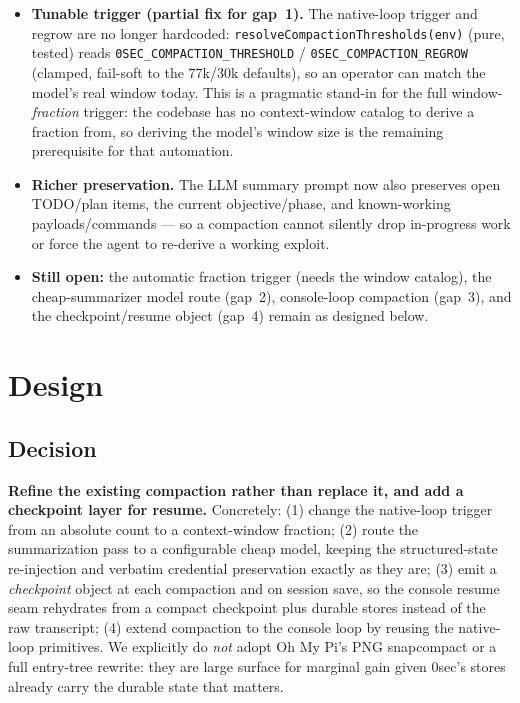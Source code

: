 \documentclass[11pt]{article}
\begin{document}
\begin{itemize}[leftmargin=1.6em]
\item \textbf{Tunable trigger (partial fix for gap~1).} The native-loop trigger
and regrow are no longer hardcoded: \texttt{resolveCompactionThresholds(env)}
(pure, tested) reads \texttt{0SEC\_COMPACTION\_THRESHOLD} /
\texttt{0SEC\_COMPACTION\_REGROW} (clamped, fail-soft to the $77$k/$30$k
defaults), so an operator can match the model's real window today. This is a
pragmatic stand-in for the full window-\emph{fraction} trigger: the codebase has
no context-window catalog to derive a fraction from, so deriving the model's
window size is the remaining prerequisite for that automation.
\item \textbf{Richer preservation.} The LLM summary prompt now also preserves
open TODO/plan items, the current objective/phase, and known-working
payloads/commands --- so a compaction cannot silently drop in-progress work or
force the agent to re-derive a working exploit.
\item \textbf{Still open:} the automatic fraction trigger (needs the window
catalog), the cheap-summarizer model route (gap~2), console-loop compaction
(gap~3), and the checkpoint/resume object (gap~4) remain as designed below.
\end{itemize}

\section{Design}

\subsection{Decision}

\textbf{Refine the existing compaction rather than replace it, and add a
checkpoint layer for resume.} Concretely: (1) change the native-loop trigger from
an absolute count to a context-window fraction; (2) route the summarization pass
to a configurable cheap model, keeping the structured-state re-injection and
verbatim credential preservation exactly as they are; (3) emit a
\emph{checkpoint} object at each compaction and on session save, so the console
resume seam rehydrates from a compact checkpoint plus durable stores instead of
the raw transcript; (4) extend compaction to the console loop by reusing the
native-loop primitives. We explicitly do \emph{not} adopt Oh My Pi's PNG
snapcompact or a full entry-tree rewrite: they are large surface for marginal
gain given 0sec's stores already carry the durable state that matters.
\end{document}

